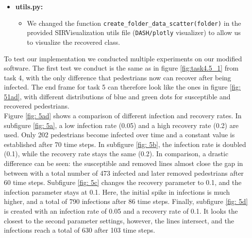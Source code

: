 \begin{itemize}
    \item \textbf{utils.py:} 
    \begin{itemize}
        \item We changed the function \texttt{create\_folder\_data\_scatter(folder)} in the provided SIRVisualization utils file (\texttt{DASH/plotly} visualizer) to allow us to visualize the recovered class.
    \end{itemize}
\end{itemize}





To test our implementation we conducted multiple experiments on our modified software. The first test we conduct is the same as in figure \ref{fig:task4.5_1} from task 4, with the only difference that pedestrians now can recover after being infected. The end frame for task 5 can therefore look like the ones in figure \ref{fig: 51ad}, with different distributions of blue and green dots for susceptible and recovered pedestrians. \\
Figure \ref{fig: 5ad} shows a comparison of different infection and recovery rates. In subfigure \ref{fig: 5a}, a low infection rate (0.05) and a high recovery rate (0.2) are used. Only 202 pedestrians become infected over time and a constant value is established after 70 time steps. In subfigure \ref{fig: 5b}, the infection rate is doubled (0.1), while the recovery rate stays the same (0.2). In comparison, a drastic difference can be seen: the susceptible and removed lines almost close the gap in between with a total number of 473 infected and later removed pedestrians after 60 time steps. Subfigure \ref{fig: 5c} changes the recovery parameter to 0.1, and the infection parameter stays at 0.1. Here, the initial spike in infections is much higher, and a total of 790 infections after 86 time steps. Finally, subfigure \ref{fig: 5d} is created with an infection rate of 0.05 and a recovery rate of 0.1. It looks the closest to the second parameter settings, however, the lines intersect, and the infections reach a total of 630 after 103 time steps.

